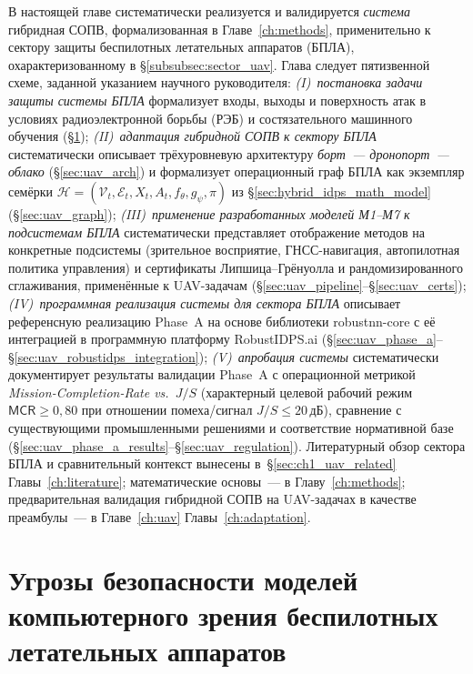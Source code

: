 В настоящей главе систематически реализуется и валидируется
\emph{система} гибридная СОПВ, формализованная в
Главе~\ref{ch:methods}, применительно к сектору защиты беспилотных
летательных аппаратов (БПЛА), охарактеризованному в
\S\ref{subsubsec:sector_uav}. Глава следует пятизвенной схеме,
заданной указанием научного руководителя:
\emph{(I)~постановка задачи защиты системы БПЛА} формализует
входы, выходы и поверхность атак в условиях радиоэлектронной
борьбы (РЭБ) и состязательного машинного обучения
(\S\ref{sec:uav_overview});
\emph{(II)~адаптация гибридной СОПВ к сектору БПЛА}
систематически описывает трёхуровневую архитектуру
\emph{борт~--- дронопорт~--- облако} (\S\ref{sec:uav_arch}) и
формализует операционный граф БПЛА как экземпляр семёрки
$\mathcal{H}=(\mathcal{V}_t, \mathcal{E}_t, X_t, A_t, f_\theta,
g_\psi, \pi)$ из \S\ref{sec:hybrid_idps_math_model}
(\S\ref{sec:uav_graph});
\emph{(III)~применение разработанных моделей М1--М7 к подсистемам
БПЛА} систематически представляет отображение методов на
конкретные подсистемы (зрительное восприятие, ГНСС-навигация,
автопилотная политика управления) и сертификаты
Липшица--Грёнуолла и рандомизированного сглаживания, применённые
к UAV-задачам
(\S\ref{sec:uav_pipeline}--\S\ref{sec:uav_certs});
\emph{(IV)~программная реализация системы для сектора БПЛА}
описывает референсную реализацию Phase~A на основе библиотеки
\textsf{robustnn-core} с её интеграцией в программную платформу
\textsf{RobustIDPS.ai}
(\S\ref{sec:uav_phase_a}--\S\ref{sec:uav_robustidps_integration});
\emph{(V)~апробация системы} систематически документирует
результаты валидации Phase~A с операционной метрикой
\emph{Mission-Completion-Rate vs.~$J/S$} (характерный целевой
рабочий режим $\textsf{MCR}\ge 0{,}80$ при отношении
помеха/сигнал $J/S \le 20\,$дБ), сравнение с существующими
промышленными решениями и соответствие нормативной базе
(\S\ref{sec:uav_phase_a_results}--\S\ref{sec:uav_regulation}).
Литературный обзор сектора БПЛА и сравнительный контекст
вынесены в~\S\ref{sec:ch1_uav_related} Главы~\ref{ch:literature};
математические основы~--- в Главу~\ref{ch:methods};
предварительная валидация гибридной СОПВ на UAV-задачах в
качестве преамбулы~--- в Главе~\ref{ch:uav}
Главы~\ref{ch:adaptation}.


\section{Угрозы безопасности моделей компьютерного зрения беспилотных летательных аппаратов}
\label{sec:uav_overview}

